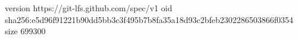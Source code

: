 version https://git-lfs.github.com/spec/v1
oid sha256:e5d96f91221b90dd5bb3c3f495b7b8fa35a18d93c2bfeb2302286503866f0354
size 699300
